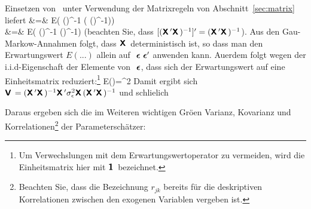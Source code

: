 Einsetzen von~ unter Verwendung der Matrixregeln von
Abschnitt~\ref{sec:matrix} liefert 
\bdma
{} &=& E\left( (\tr{})^{-1}\tr\veceps
\left( (\tr{})^{-1}\tr\veceps\right)\tr\right) \\
 &=& E\left( (\tr{})^{-1}\tr \veceps\veceps\tr
{}(\tr{})^{-1}\right)
\edma
(beachten Sie, dass
$[(\textbf{\textsf{X}}\,'\textbf{\textsf{X}}\,)^{-1}]'=(\textbf{\textsf{X}}\,'\textbf{\textsf{X}}\,)^{-1}$). Aus den Gau\3-Markow-Annahmen folgt, dass $\textbf{\textsf{X}}\,$ deterministisch ist,
so dass man den Erwartungswert $E(...)$ allein auf ${\mbox{ \boldmath{$\epsilon$}}}{\mbox{ \boldmath{$\epsilon$}}}'$
anwenden kann. Au\3erdem folgt wegen der i.i.d-Eigenschaft der
Elemente von ${\mbox{ \boldmath{$\epsilon$}}}$, dass sich der Erwartungswert auf eine
Einheitsmatrix reduziert:\footnote{Um Verwechslungen mit dem
Erwartungswertoperator zu vermeiden, wird die Einheitsmatrix hier mit
$\textbf{\textsf{1}}\,$ bezeichnet.}
\be
E(\veceps\veceps\tr)=\sigeps^2
\ee
Damit ergibt sich
$
\textbf{\textsf{V}}\,=(\textbf{\textsf{X}}\,'\textbf{\textsf{X}}\,)^{-1}\textbf{\textsf{X}}\,'\sigma_{\epsilon}^2\textbf{\textsf{X}}\,(\textbf{\textsf{X}}\,'\textbf{\textsf{X}}\,)^{-1}$
und schlie\3lich

 Daraus ergeben sich die im Weiteren wichtigen Gr\"o\3en Varianz,
Kovarianz und Korrelationen\footnote{Beachten Sie, dass die
  Bezeichnung $r_{jk}$
  bereits f\"ur die deskriptiven Korrelationen zwischen den exogenen
  Variablen vergeben ist.} der Parametersch\"atzer:


%


